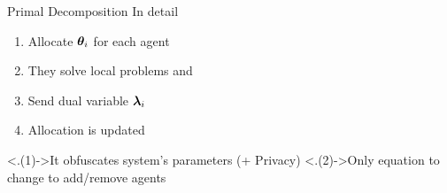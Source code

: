 \documentclass[aspectratio=169]{beamer}
\begin{document}
\begin{frame}{Primal Decomposition }{In detail}
  \begin{minipage}[c]{.5\linewidth}
    \begin{enumerate}[<+(2)->]
      \item Allocate $\boldsymbol{\theta}_{i}$ for each agent
      \item They solve local problems and
      \item Send dual variable $\boldsymbol{\lambda}_{i}$\footnotemark
      \item Allocation is updated\footnotemark {}
    \end{enumerate}
  \end{minipage}
  \footnotetext<.(1)->{It obfuscates system's parameters (+ Privacy)}
  \footnotetext<.(2)->{Only equation to change to add/remove agents}
  \hfill
  \begin{minipage}[c]{.45\linewidth}
  \end{minipage}
\end{frame}
\end{document}
